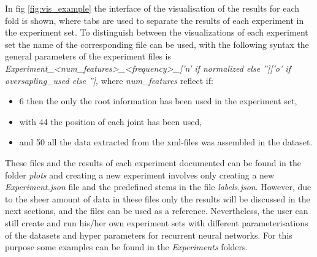 	In fig \ref{fig:vis_example} the interface of the visualisation of the results for each fold is shown, where tabs are used to separate the results of each experiment in the experiment set. To distinguish between the visualizations of each experiment set the name of the corresponding file can be used, with the following syntax the general parameters of the experiment files is \textit{Experiment\_<num\_features>\_<frequency>\_['n' if normalized else '']['o' if oversapling\_used else '']}, where \textit{num\_features} reflect if:
	\begin{itemize}
		\item 6 then the only the root information has been used in the experiment set,
		\item with 44 the position of each joint has been used, 
		\item and 50 all the data extracted from the xml-files was assembled in the dataset.
	\end{itemize}
	These files and the results of each experiment documented can be found in the folder \textit{plots} and creating a new experiment involves only creating a new \textit{Experiment.json} file and the predefined stems in the file \textit{labels.json}. However, due to the sheer amount of data in these files only the results will be discussed in the next sections, and the files can be used as a reference. Nevertheless, the user can still create and run his/her own experiment sets with different parameterisations of the datasets and hyper parameters for recurrent neural networks. For this purpose some examples can be found in the \textit{Experiments} folders.
